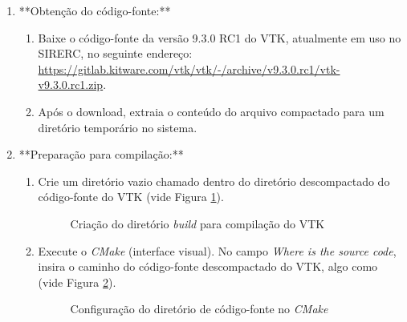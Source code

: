 \documentclass[a4paper,11pt]{article}
\newcommand{\sistema}{\textsf{SIRERC}}
\newcommand{\cmake}{\textit{CMake}}
\newcommand{\build}{\textit{build}}
\begin{document}
\begin{enumerate}
	\item **Obtenção do código-fonte:**
	\begin{enumerate}
		\item Baixe o código-fonte da versão 9.3.0 RC1 do VTK, atualmente em uso no \sistema{}, no seguinte endereço: \url{https://gitlab.kitware.com/vtk/vtk/-/archive/v9.3.0.rc1/vtk-v9.3.0.rc1.zip}.
		\item Após o download, extraia o conteúdo do arquivo compactado para um diretório temporário no sistema.
	\end{enumerate}
	
	\item **Preparação para compilação:**
	\begin{enumerate}
		\item Crie um diretório vazio chamado  dentro do diretório descompactado do código-fonte do VTK (vide Figura \ref{fig:vtkbuilddir}).
		
		\begin{figure}[H]\centering
			\caption{Criação do diretório \build{} para compilação do VTK}\label{fig:vtkbuilddir}
		\end{figure}
		
		\item Execute o \cmake{} (interface visual). No campo \emph{Where is the source code}, insira o caminho do código-fonte descompactado do VTK, algo como  (vide Figura \ref{fig:vtkbuildsrc}).
		
		\begin{figure}[H]\centering
			\caption{Configuração do diretório de código-fonte no \cmake{}}\label{fig:vtkbuildsrc}
		\end{figure}
		

\end{enumerate}
\end{enumerate}
\end{document}
